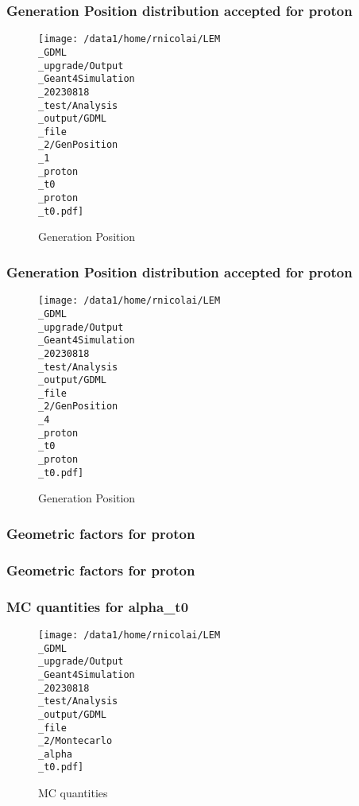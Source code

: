 \documentclass[8pt]{beamer}
\begin{document}
            \begin{frame}
                \frametitle{Generation Position distribution accepted for proton}
            
        \begin{figure}[h]
            \centering
            \texttt{[image: /data1/home/rnicolai/LEM\\\_GDML\\\_upgrade/Output\\\_Geant4Simulation\\\_20230818\\\_test/Analysis\\\_output/GDML\\\_file\\\_2/GenPosition\\\_1\\\_proton\\\_t0\\\_proton\\\_t0.pdf]}
            \caption{Generation Position}
        \end{figure}
        
            \end{frame}
            
            \begin{frame}
                \frametitle{Generation Position distribution accepted for proton}
            
        \begin{figure}[h]
            \centering
            \texttt{[image: /data1/home/rnicolai/LEM\\\_GDML\\\_upgrade/Output\\\_Geant4Simulation\\\_20230818\\\_test/Analysis\\\_output/GDML\\\_file\\\_2/GenPosition\\\_4\\\_proton\\\_t0\\\_proton\\\_t0.pdf]}
            \caption{Generation Position}
        \end{figure}
        
            \end{frame}
            
            \begin{frame}
                \frametitle{Geometric factors for proton}
            
            \end{frame}
            
            \begin{frame}
                \frametitle{Geometric factors for proton}
            
            \end{frame}
            
            \begin{frame}
                \frametitle{MC quantities for alpha\_t0}
            
        \begin{figure}[h]
            \centering
            \texttt{[image: /data1/home/rnicolai/LEM\\\_GDML\\\_upgrade/Output\\\_Geant4Simulation\\\_20230818\\\_test/Analysis\\\_output/GDML\\\_file\\\_2/Montecarlo\\\_alpha\\\_t0.pdf]}
            \caption{MC quantities}
        \end{figure}
        
            \end{frame}
            
\end{document}
